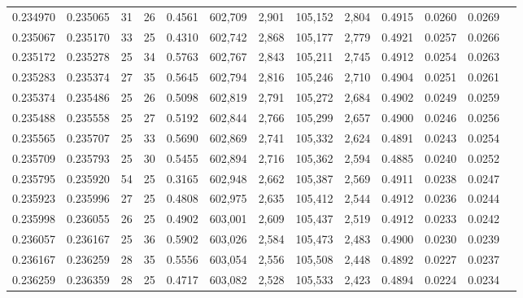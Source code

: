 \begin{tabular}{rrrrrrrrrrrrr}
0.234970 & 0.235065 &  31 &  26 &                                     0.4561 & 602,709 &   2,901 & 105,152 &   2,804 & 0.4915 & 0.0260 & 0.0269 \\
0.235067 & 0.235170 &  33 &  25 &                                     0.4310 & 602,742 &   2,868 & 105,177 &   2,779 & 0.4921 & 0.0257 & 0.0266 \\
0.235172 & 0.235278 &  25 &  34 &                                     0.5763 & 602,767 &   2,843 & 105,211 &   2,745 & 0.4912 & 0.0254 & 0.0263 \\
0.235283 & 0.235374 &  27 &  35 &                                     0.5645 & 602,794 &   2,816 & 105,246 &   2,710 & 0.4904 & 0.0251 & 0.0261 \\
0.235374 & 0.235486 &  25 &  26 &                                     0.5098 & 602,819 &   2,791 & 105,272 &   2,684 & 0.4902 & 0.0249 & 0.0259 \\
0.235488 & 0.235558 &  25 &  27 &                                     0.5192 & 602,844 &   2,766 & 105,299 &   2,657 & 0.4900 & 0.0246 & 0.0256 \\
0.235565 & 0.235707 &  25 &  33 &                                     0.5690 & 602,869 &   2,741 & 105,332 &   2,624 & 0.4891 & 0.0243 & 0.0254 \\
0.235709 & 0.235793 &  25 &  30 &                                     0.5455 & 602,894 &   2,716 & 105,362 &   2,594 & 0.4885 & 0.0240 & 0.0252 \\
0.235795 & 0.235920 &  54 &  25 &                                     0.3165 & 602,948 &   2,662 & 105,387 &   2,569 & 0.4911 & 0.0238 & 0.0247 \\
0.235923 & 0.235996 &  27 &  25 &                                     0.4808 & 602,975 &   2,635 & 105,412 &   2,544 & 0.4912 & 0.0236 & 0.0244 \\
0.235998 & 0.236055 &  26 &  25 &                                     0.4902 & 603,001 &   2,609 & 105,437 &   2,519 & 0.4912 & 0.0233 & 0.0242 \\
0.236057 & 0.236167 &  25 &  36 &                                     0.5902 & 603,026 &   2,584 & 105,473 &   2,483 & 0.4900 & 0.0230 & 0.0239 \\
0.236167 & 0.236259 &  28 &  35 &                                     0.5556 & 603,054 &   2,556 & 105,508 &   2,448 & 0.4892 & 0.0227 & 0.0237 \\
0.236259 & 0.236359 &  28 &  25 &                                     0.4717 & 603,082 &   2,528 & 105,533 &   2,423 & 0.4894 & 0.0224 & 0.0234 \\

\end{tabular}
